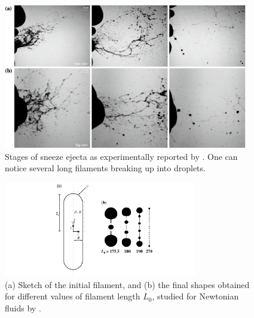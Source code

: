 \documentclass[a4paper,10pt]{article}
\begin{document}
\begin{figure}[H]
\begin{center}
 \includegraphics[width=0.95\textwidth]{sneeze.png}
 \caption{Stages of sneeze ejecta as experimentally reported by \citet{scharfman2016visualization}. One can notice several long filaments breaking up into droplets.}
 \label{Figure::Typical}
\end{center}
\end{figure}

\begin{figure}[H]
	\begin{center}
		\includegraphics[width=0.75\textwidth]{filament_01.pdf}
		\caption{(a) Sketch of the initial filament, and (b) the final shapes obtained for different values of filament length $L_0$, studied for Newtonian fluids by \citet{anthony2019dynamics}. }
		\label{fig:filament}
	\end{center}
\end{figure}
\end{document}
